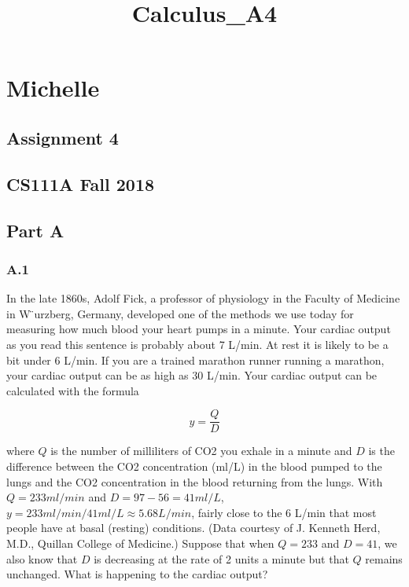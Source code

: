 \documentclass[11pt]{article}
\title{Calculus\_A4}
\begin{document}
    
    
    \maketitle
    
    

    
    \section{Michelle}\label{michelle}

\subsection{Assignment 4}\label{assignment-4}

\subsection{CS111A Fall 2018}\label{cs111a-fall-2018}

    \subsection{Part A}\label{part-a}

\subsubsection{A.1}\label{a.1}

In the late 1860s, Adolf Fick, a professor of physiology in the Faculty
of Medicine in W ̈urzberg, Germany, developed one of the methods we use
today for measuring how much blood your heart pumps in a minute. Your
cardiac output as you read this sentence is probably about 7 L/min. At
rest it is likely to be a bit under 6 L/min. If you are a trained
marathon runner running a marathon, your cardiac output can be as high
as 30 L/min. Your cardiac output can be calculated with the formula

\[y = \frac{Q}{D}\]

where \(Q\) is the number of milliliters of CO2 you exhale in a minute
and \(D\) is the difference between the CO2 concentration (ml/L) in the
blood pumped to the lungs and the CO2 concentration in the blood
returning from the lungs. With \(Q = 233 ml/min\) and
\(D = 97 − 56 = 41 ml/L\), \(y = 233 ml/min/ 41 ml/L ≈ 5.68 L/min\),
fairly close to the 6 L/min that most people have at basal (resting)
conditions. (Data courtesy of J. Kenneth Herd, M.D., Quillan College of
Medicine.) Suppose that when \(Q = 233\) and \(D = 41\), we also know
that \(D\) is decreasing at the rate of 2 units a minute but that \(Q\)
remains unchanged. What is happening to the cardiac output?
\end{document}
